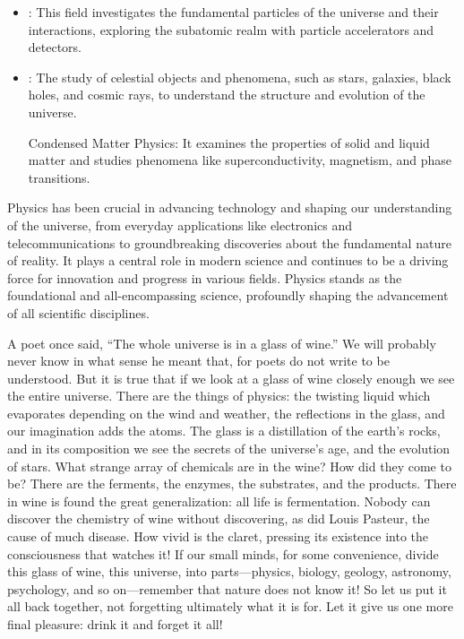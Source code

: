 \begin{itemize}
	\item {}: This field investigates the fundamental particles of the universe and their interactions, exploring the subatomic realm with particle accelerators and detectors.

	\item {}: The study of celestial objects and phenomena, such as stars, galaxies, black holes, and cosmic rays, to understand the structure and evolution of the universe.

Condensed Matter Physics: It examines the properties of solid and liquid matter and studies phenomena like superconductivity, magnetism, and phase transitions.
\end{itemize}

Physics has been crucial in advancing technology and shaping our understanding of the universe, from everyday applications like electronics and telecommunications to groundbreaking discoveries about the fundamental nature of reality. It plays a central role in modern science and continues to be a driving force for innovation and progress in various fields. Physics stands as the foundational and all-encompassing science, profoundly shaping the advancement of all scientific disciplines.

\begin{interestnote}
	A poet once said, “The whole universe is in a glass of wine.” We will probably never know in what sense he meant that, for poets do not write to be understood. But it is true that if we look at a glass of wine closely enough we see the entire universe. There are the things of physics: the twisting liquid which evaporates depending on the wind and weather, the reflections in the glass, and our imagination adds the atoms. The glass is a distillation of the earth’s rocks, and in its composition we see the secrets of the universe’s age, and the evolution of stars. What strange array of chemicals are in the wine? How did they come to be? There are the ferments, the enzymes, the substrates, and the products. There in wine is found the great generalization: all life is fermentation. Nobody can discover the chemistry of wine without discovering, as did Louis Pasteur, the cause of much disease. How vivid is the claret, pressing its existence into the consciousness that watches it! If our small minds, for some convenience, divide this glass of wine, this universe, into parts—physics, biology, geology, astronomy, psychology, and so on—remember that nature does not know it! So let us put it all back together, not forgetting ultimately what it is for. Let it give us one more final pleasure: drink it and forget it all! \cite{bib:feynman lectures}
\end{interestnote}



